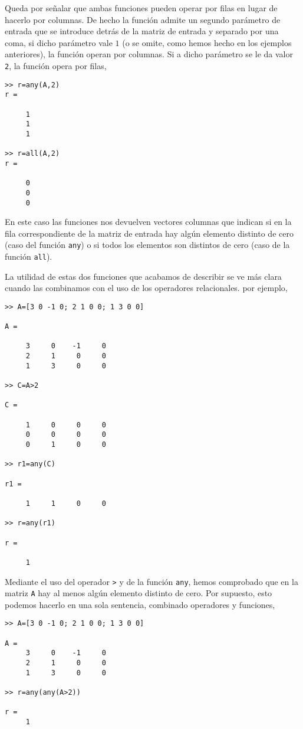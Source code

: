 Queda por señalar que ambas funciones pueden operar por filas en lugar de hacerlo por columnas. De hecho la función admite un segundo parámetro de entrada que se introduce detrás de la matriz de entrada y separado por una coma, si dicho parámetro vale $1$ (o se omite, como hemos hecho en los ejemplos anteriores), la función operan por columnas. Si a dicho parámetro se le da valor \texttt{2}, la función opera por filas,
\begin{verbatim}
>> r=any(A,2)
r =

     1
     1
     1

>> r=all(A,2)
r =

     0
     0
     0

\end{verbatim}
En este caso las funciones nos devuelven vectores columnas que indican si en la fila correspondiente de la matriz de entrada hay algún elemento distinto de cero (caso del función \texttt{any}) o si todos los elementos son distintos de cero (caso de la función \texttt{all}).

La utilidad de estas dos funciones que acabamos de describir se ve más clara cuando las combinamos con el uso de los operadores relacionales.  por ejemplo,
\begin{verbatim}
>> A=[3 0 -1 0; 2 1 0 0; 1 3 0 0]

A =

     3     0    -1     0
     2     1     0     0
     1     3     0     0

>> C=A>2

C =

     1     0     0     0
     0     0     0     0
     0     1     0     0

>> r1=any(C)

r1 =

     1     1     0     0

>> r=any(r1)

r =

     1

\end{verbatim}

 Mediante el uso del operador \texttt{>} y de la función \texttt{any}, hemos comprobado que en la matriz \texttt{A} hay al menos algún elemento distinto de cero. Por supuesto, esto podemos hacerlo en una sola sentencia, combinado operadores y funciones,
 
\begin{verbatim}
>> A=[3 0 -1 0; 2 1 0 0; 1 3 0 0]

A =
     3     0    -1     0
     2     1     0     0
     1     3     0     0

>> r=any(any(A>2))

r =
     1
\end{verbatim}

